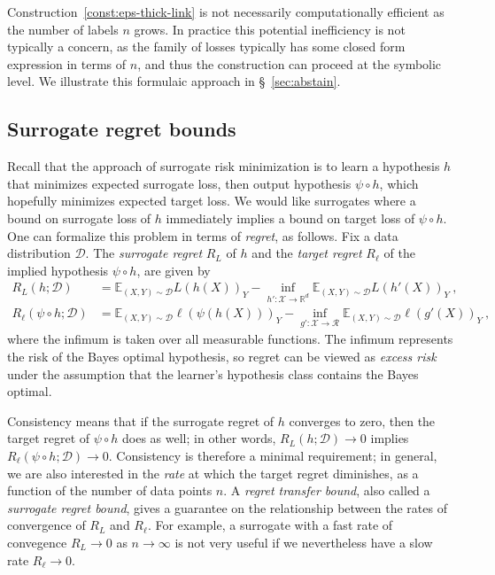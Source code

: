 \documentclass[twoside,11pt]{article}
\newcommand{\Comments}{1}
\newcommand{\mytodo}[2]{\ifnum\Comments=1%
  \todo[linecolor=#1!80!black,backgroundcolor=#1,bordercolor=#1!80!black]{#2}\fi}
\newcommand{\raft}[1]{\mytodo{green!20!white}{RF: #1}}
\newcommand{\jessiet}[1]{\mytodo{teal!20!white}{JF: #1}}
\newcommand{\reals}{\mathbb{R}}
\newcommand{\D}{\mathcal{D}}
\newcommand{\E}{\mathbb{E}}
\newcommand{\R}{\mathcal{R}}
\newcommand{\X}{\mathcal{X}}
\begin{document}
Construction~\ref{const:eps-thick-link} is not necessarily computationally efficient as the number of labels $n$ grows.
In practice this potential inefficiency is not typically a concern, as the family of losses typically has some closed form expression in terms of $n$, and thus the construction can proceed at the symbolic level.
We illustrate this formulaic approach in \S~\ref{sec:abstain}.

\subsection{Surrogate regret bounds}\label{subsec:regret-bounds}
Recall that the approach of surrogate risk minimization is to learn a hypothesis $h$ that minimizes expected surrogate loss, then output hypothesis $\psi \circ h$, which hopefully minimizes expected target loss.
We would like surrogates where a bound on surrogate loss of $h$ immediately implies a bound on target loss of $\psi \circ h$.
One can formalize this problem in terms of \emph{regret}, as follows.
Fix a data distribution $\D$.
The \emph{surrogate regret} $R_L$ of $h$ and the \emph{target regret} $R_{\ell}$ of the implied hypothesis $\psi \circ h$, are given by
\begin{align*}
  R_L(h;\D) &= \E_{(X,Y)\sim\D} L(h(X))_Y - \inf_{h':\X\to\reals^d} \E_{(X,Y)\sim\D} L(h'(X))_Y~,
  \\
  R_\ell(\psi\circ h;\D) &= \E_{(X,Y)\sim\D} \ell(\psi(h(X)))_Y - \inf_{g':\X\to\R} \E_{(X,Y)\sim\D} \ell(g'(X))_Y~,
\end{align*}
where the infimum is taken over all measurable functions.
The infimum represents the risk of the Bayes optimal hypothesis, so regret can be viewed as \emph{excess risk} under the assumption that the learner's hypothesis class contains the Bayes optimal.

Consistency means that if the surrogate regret of $h$ converges to zero, then the target regret of $\psi \circ h$ does as well; in other words, $R_L(h;\D) \to 0$ implies $R_{\ell}(\psi \circ h;\D) \to 0$.
Consistency is therefore a minimal requirement; in general, we are also interested in the \emph{rate} at which the target regret diminishes, as a function of the number of data points $n$.
A \emph{regret transfer bound}, also called a \emph{surrogate regret bound}, gives a guarantee on the relationship between the rates of convergence of $R_L$ and $R_{\ell}$.
For example, a surrogate with a fast rate of convegence $R_L \to 0$ as $n \to \infty$ is not very useful if we nevertheless have a slow rate $R_{\ell} \to 0$.
\end{document}
